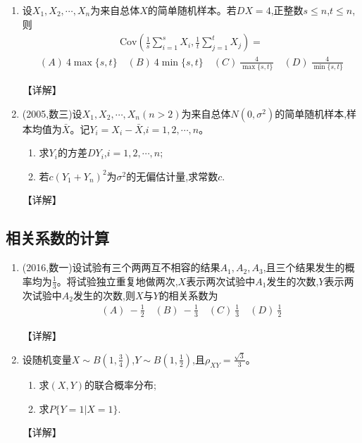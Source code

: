 \documentclass[12pt, a4paper, oneside, UTF8]{ctexbook}
\begin{document}
\begin{enumerate}[label=\arabic*.,start=11]
    \item  设$X_1,X_2,\cdots,X_n$为来自总体$X$的简单随机样本。若$DX=4$,正整数$s\leq n$,$t\leq n$,则
    \begin{align*}
        \text{Cov}\left(\frac{1}{s}\sum_{i=1}^s X_i,\frac{1}{t}\sum_{j=1}^t X_j\right)=
    \end{align*}
    \begin{align*}
        (A)\ 4\max\{s,t\} \quad (B)\ 4\min\{s,t\} \quad (C)\ \frac{4}{\max\{s,t\}} \quad (D)\ \frac{4}{\min\{s,t\}}
    \end{align*}
    
    \begin{solution}
    【详解】
    \end{solution}
    
    \item  (2005,数三)设$X_1,X_2,\cdots,X_n(n>2)$为来自总体$N(0,\sigma^2)$的简单随机样本,样本均值为$\bar{X}$。记$Y_i=X_i-\bar{X}$,$i=1,2,\cdots,n$。
    \begin{enumerate}
        \item 求$Y_i$的方差$DY_i$,$i=1,2,\cdots,n$;
        \item 若$c(Y_1+Y_n)^2$为$\sigma^2$的无偏估计量,求常数$c$.
    \end{enumerate}
    
    \begin{solution}
    【详解】
    \end{solution}
\end{enumerate}

\subsection{相关系数的计算}

\begin{enumerate}[label=\arabic*.,start=13]
    \item  (2016,数一)设试验有三个两两互不相容的结果$A_1,A_2,A_3$,且三个结果发生的概率均为$\frac{1}{3}$。将试验独立重复地做两次,$X$表示两次试验中$A_1$发生的次数,$Y$表示两次试验中$A_2$发生的次数,则$X$与$Y$的相关系数为
    \begin{align*}
        (A)\ -\frac{1}{2} \quad (B)\ -\frac{1}{3} \quad (C)\ \frac{1}{3} \quad (D)\ \frac{1}{2}
    \end{align*}
    
    \begin{solution}
    【详解】
    \end{solution}
    
    \item  设随机变量$X\sim B\left(1,\frac{3}{4}\right)$,$Y\sim B\left(1,\frac{1}{2}\right)$,且$\rho_{XY}=\frac{\sqrt{3}}{3}$。
    \begin{enumerate}
        \item 求$(X,Y)$的联合概率分布;
        \item 求$P\{Y=1|X=1\}$.
    \end{enumerate}
    
    \begin{solution}
    【详解】
    \end{solution}
\end{enumerate}
\end{document}
